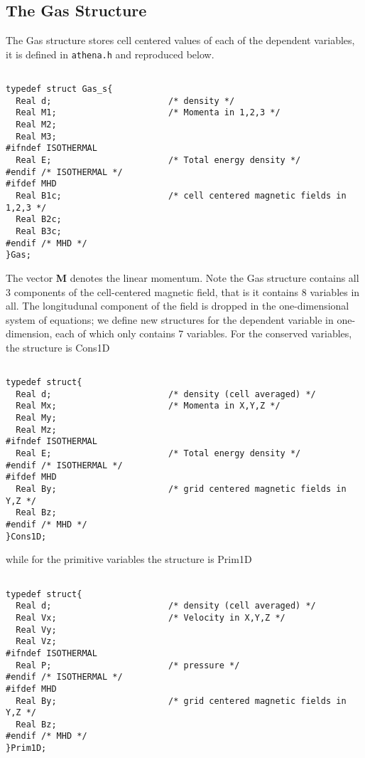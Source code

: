 \subsection{The Gas Structure}

The Gas structure stores cell centered values of each of the
dependent variables, it is defined in {\tt athena.h} and
reproduced below.

\footnotesize
\begin{verbatim}

typedef struct Gas_s{
  Real d;                       /* density */
  Real M1;                      /* Momenta in 1,2,3 */
  Real M2;
  Real M3;
#ifndef ISOTHERMAL
  Real E;                       /* Total energy density */
#endif /* ISOTHERMAL */
#ifdef MHD
  Real B1c;                     /* cell centered magnetic fields in 1,2,3 */
  Real B2c;
  Real B3c;
#endif /* MHD */
}Gas;

\end{verbatim}
\normalsize

The vector {\bf M} denotes the linear momentum.
Note the Gas structure contains all 3 components of the cell-centered
magnetic field, that is it contains 8 variables in all.
The longitudunal component of the field is dropped in the one-dimensional
system of equations; we define new structures for the dependent variable
in one-dimension, each of which only contains 7 variables.
For the conserved variables, the structure is Cons1D

\footnotesize
\begin{verbatim}

typedef struct{
  Real d;                       /* density (cell averaged) */
  Real Mx;                      /* Momenta in X,Y,Z */
  Real My;
  Real Mz;
#ifndef ISOTHERMAL
  Real E;                       /* Total energy density */
#endif /* ISOTHERMAL */
#ifdef MHD
  Real By;                      /* grid centered magnetic fields in Y,Z */
  Real Bz;
#endif /* MHD */
}Cons1D;

\end{verbatim}
\normalsize

while for the primitive variables the structure is Prim1D

\footnotesize
\begin{verbatim}

typedef struct{
  Real d;                       /* density (cell averaged) */
  Real Vx;                      /* Velocity in X,Y,Z */
  Real Vy;
  Real Vz;
#ifndef ISOTHERMAL
  Real P;                       /* pressure */
#endif /* ISOTHERMAL */
#ifdef MHD
  Real By;                      /* grid centered magnetic fields in Y,Z */
  Real Bz;
#endif /* MHD */
}Prim1D;

\end{verbatim}
\normalsize

